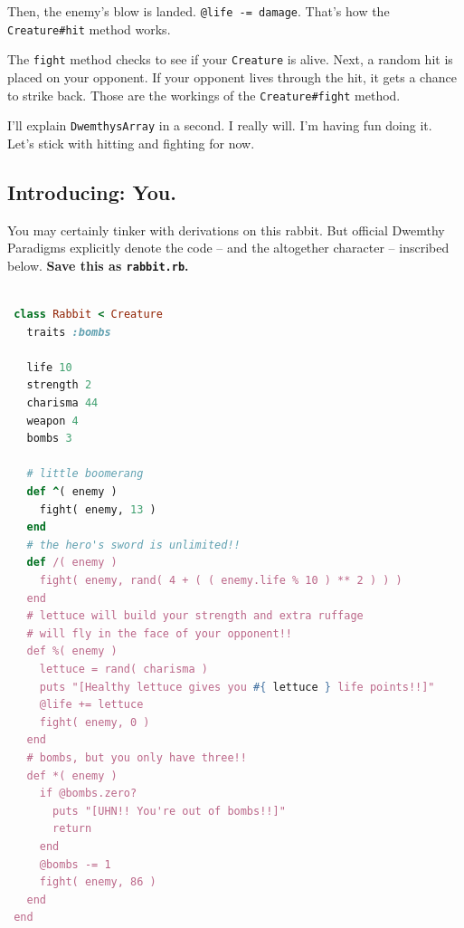\documentclass[10pt,twoside]{report}
\begin{document}
Then, the enemy's blow is landed.  
\lstinline[breaklines=true]|@life -= damage|.  
That's how the \lstinline[breaklines=true]|Creature#hit|
method works.

The \lstinline[breaklines=true]|fight| method checks to see if your
\lstinline[breaklines=true]|Creature| is alive.  Next, a random hit is
placed on your opponent.  If your opponent lives through the hit, it
gets a chance to strike back.  Those are the workings of the
\lstinline[breaklines=true]|Creature#fight| method.

I'll explain \lstinline[breaklines=true]|DwemthysArray| in a second.
I really will.  I'm having fun doing it. Let's stick with hitting and
fighting for now.



\subsection{Introducing: You.}



You may certainly tinker with derivations on this rabbit.  But
official Dwemthy Paradigms explicitly denote the code -- and the
altogether character -- inscribed below.  {\bf Save this as
  \lstinline[breaklines=true]|rabbit.rb|.}


\begin{lstlisting}[basicstyle=\ttfamily\color{basiccolor},
    commentstyle = \ttfamily\color{commentcolor},
    keywordstyle=\ttfamily\color{keywordscolor},
    stringstyle=\color{stringcolor},
    language=Ruby,
    basicstyle=\small\ttfamily,
    showstringspaces=false,
  ]

 class Rabbit < Creature
   traits :bombs

   life 10
   strength 2
   charisma 44
   weapon 4
   bombs 3

   # little boomerang
   def ^( enemy )
     fight( enemy, 13 )
   end
   # the hero's sword is unlimited!!
   def /( enemy )
     fight( enemy, rand( 4 + ( ( enemy.life % 10 ) ** 2 ) ) )
   end
   # lettuce will build your strength and extra ruffage
   # will fly in the face of your opponent!!
   def %( enemy )
     lettuce = rand( charisma )
     puts "[Healthy lettuce gives you #{ lettuce } life points!!]"
     @life += lettuce
     fight( enemy, 0 )
   end
   # bombs, but you only have three!!
   def *( enemy )
     if @bombs.zero?
       puts "[UHN!! You're out of bombs!!]"
       return
     end
     @bombs -= 1
     fight( enemy, 86 )
   end
 end

\end{lstlisting}
\end{document}
